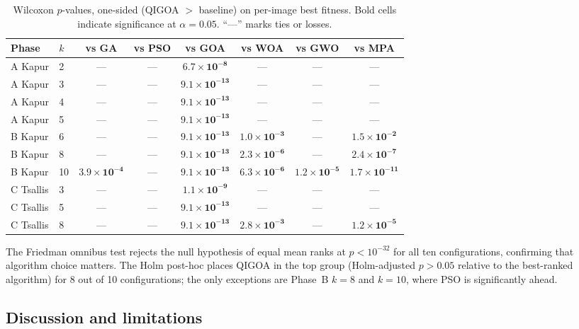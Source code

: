 \begin{table}[!t]
\centering\small
\caption{Wilcoxon $p$-values, one-sided (QIGOA $>$ baseline) on per-image best fitness. Bold cells indicate significance at $\alpha{=}0.05$. ``---'' marks ties or losses.}\label{tab:wilcoxon}
\begin{tabular}{llcccccc}
\toprule
Phase & $k$ & vs GA & vs PSO & vs GOA & vs WOA & vs GWO & vs MPA \\
\midrule
A Kapur & 2 & --- & --- & $\mathbf{6.7{\times}10^{-8}}$ & --- & --- & --- \\
A Kapur & 3 & --- & --- & $\mathbf{9.1{\times}10^{-13}}$ & --- & --- & --- \\
A Kapur & 4 & --- & --- & $\mathbf{9.1{\times}10^{-13}}$ & --- & --- & --- \\
A Kapur & 5 & --- & --- & $\mathbf{9.1{\times}10^{-13}}$ & --- & --- & --- \\
B Kapur & 6 & --- & --- & $\mathbf{9.1{\times}10^{-13}}$ & $\mathbf{1.0{\times}10^{-3}}$ & --- & $\mathbf{1.5{\times}10^{-2}}$ \\
B Kapur & 8 & --- & --- & $\mathbf{9.1{\times}10^{-13}}$ & $\mathbf{2.3{\times}10^{-6}}$ & --- & $\mathbf{2.4{\times}10^{-7}}$ \\
B Kapur & 10& $\mathbf{3.9{\times}10^{-4}}$ & --- & $\mathbf{9.1{\times}10^{-13}}$ & $\mathbf{6.3{\times}10^{-6}}$ & $\mathbf{1.2{\times}10^{-5}}$ & $\mathbf{1.7{\times}10^{-11}}$ \\
C Tsallis & 3 & --- & --- & $\mathbf{1.1{\times}10^{-9}}$ & --- & --- & --- \\
C Tsallis & 5 & --- & --- & $\mathbf{9.1{\times}10^{-13}}$ & --- & --- & --- \\
C Tsallis & 8 & --- & --- & $\mathbf{9.1{\times}10^{-13}}$ & $\mathbf{2.8{\times}10^{-3}}$ & --- & $\mathbf{1.2{\times}10^{-5}}$ \\
\bottomrule
\end{tabular}
\end{table}

The Friedman omnibus test rejects the null hypothesis of equal mean ranks at $p{<}10^{-32}$ for all ten configurations, confirming that algorithm choice matters. The Holm post-hoc places QIGOA in the top group (Holm-adjusted $p{>}0.05$ relative to the best-ranked algorithm) for 8 out of 10 configurations; the only exceptions are Phase~B $k{=}8$ and $k{=}10$, where PSO is significantly ahead.

\subsection{Discussion and limitations}\label{sec:discussion-limit}

